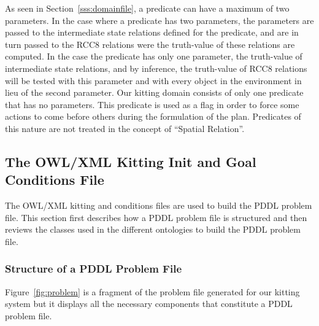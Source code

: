 \begin{itemize}
As seen in Section~\ref{sss:domainfile}, a predicate can have a maximum of two parameters. In the case where a predicate has two parameters, the parameters are passed to the intermediate state relations defined for the predicate, and are in turn passed to the RCC8 relations were the truth-value of these relations are computed. In the case the predicate has only one parameter, the truth-value of intermediate state relations, and by inference, the truth-value of RCC8 relations will be tested with this parameter and with every object in the environment in lieu of the second parameter. Our kitting domain consists of only one predicate that has no parameters. This predicate is used as a flag in order to force some actions to come before others during the formulation of the plan. Predicates of this nature are not treated in the concept of ``Spatial Relation''.
\end{itemize}



\subsection{The OWL/XML Kitting Init and Goal Conditions File} \label{owlinitgoal}
The OWL/XML kitting  and  conditions files are used to build the PDDL problem file. This section first describes how a PDDL problem file is structured and then reviews the classes used in the different ontologies to build the PDDL problem file.

\subsubsection{Structure of a PDDL Problem File}
Figure~\ref{fig:problem} is a fragment of the problem file generated for our kitting system but it displays all the necessary components that constitute a PDDL problem file.

